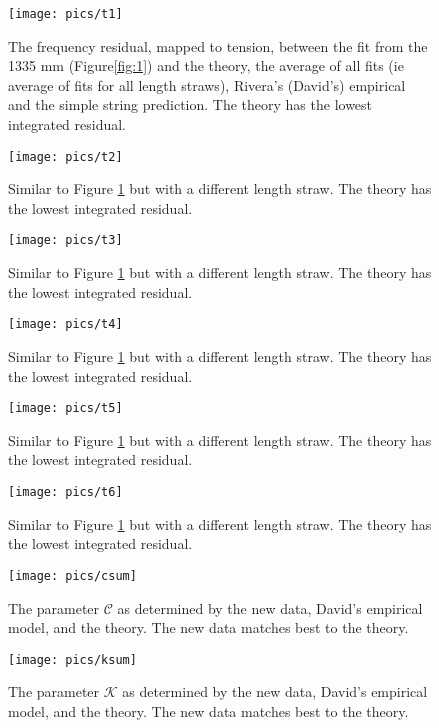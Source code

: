 \documentclass[twoside]{article}
\begin{document}
\begin{multicols}{2}
\begin{figure}[H]
	\texttt{[image: pics/t1]}
	\caption{The frequency residual, mapped to tension, between the fit from the 1335 mm (Figure\ref{fig:1}) and the theory, the average of all fits (ie average of fits for all length straws), Rivera's (David's) empirical  and the simple string prediction. The theory has the lowest integrated residual.
	}
	\label{fig:1t}
\end{figure}
\begin{figure}[H]
	\texttt{[image: pics/t2]}
	\caption{Similar to Figure \ref{fig:1t} but with a different length straw. The theory has the lowest integrated residual.
	}
\end{figure}
\begin{figure}[H]
	\texttt{[image: pics/t3]}
	\caption{Similar to Figure \ref{fig:1t} but with a different length straw. The theory has the lowest integrated residual.
	}
\end{figure}
\begin{figure}[H]
	\texttt{[image: pics/t4]}
	\caption{Similar to Figure \ref{fig:1t} but with a different length straw. The theory has the lowest integrated residual.
	}
\end{figure}
\begin{figure}[H]
	\texttt{[image: pics/t5]}
	\caption{Similar to Figure \ref{fig:1t} but with a different length straw. The theory has the lowest integrated residual.
	}
\end{figure}
\begin{figure}[H]
	\texttt{[image: pics/t6]}
	\caption{Similar to Figure \ref{fig:1t} but with a different length straw. The theory has the lowest integrated residual.
	}
\end{figure}


\begin{figure}[H]
	\texttt{[image: pics/csum]}
	\caption{The parameter $\mathcal{C}$ as determined by the new data, David's empirical model, and the theory. The new data matches best to the theory.
	}
\end{figure}

\begin{figure}[H]
	\texttt{[image: pics/ksum]}
	\caption{The parameter $\mathcal{K}$ as determined by the new data, David's empirical model, and the theory. The new data matches best to the theory.
	}
\end{figure}


\end{multicols}
\end{document}
